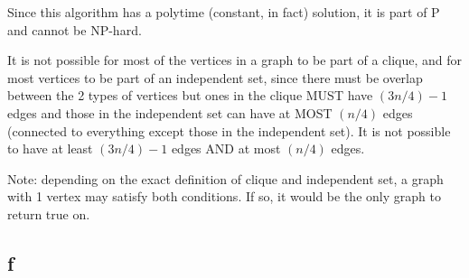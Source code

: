 \documentclass[a4paper]{article}
\begin{document}
Since this algorithm has a polytime (constant, in fact) solution, it is part of P and cannot be NP-hard.

It is not possible for most of the vertices in a graph to be part of a clique, and for most vertices to be part of an independent set, since there must be overlap between the 2 types of vertices but ones in the clique MUST have $(3n/4) -1$ edges and those in the independent set can have at MOST $(n/4)$ edges (connected to everything except those in the independent set). It is not possible to have at least $(3n/4) -1$ edges AND at most $(n/4)$ edges.

Note: depending on the exact definition of clique and independent set, a graph with 1 vertex may satisfy both conditions. If so, it would be the only graph to return true on.

\subsection{f}
\end{document}

